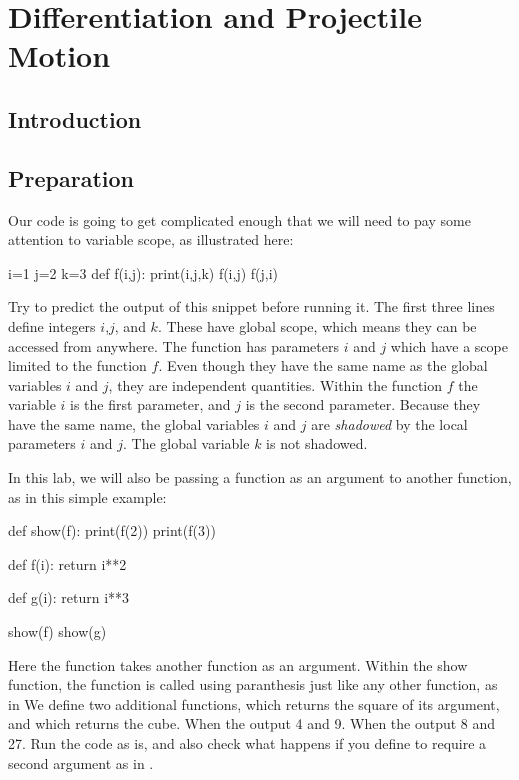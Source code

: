 \chapter{Differentiation and Projectile Motion}

\section{Introduction}

\section{Preparation}

Our code is going to get complicated enough that we will need to pay
some attention to variable scope, as illustrated here:
\begin{python}
i=1
j=2
k=3
def f(i,j):
    print(i,j,k)
f(i,j)
f(j,i)
\end{python}
Try to predict the output of this snippet before running it.  The
first three lines define integers $i$,$j$, and $k$. These have global
scope, which means they can be accessed from anywhere.  The function
 has parameters $i$ and $j$ which have a scope limited to
the function $f$.  Even though they have the same name as the global
variables $i$ and $j$, they are independent quantities.  Within the
function $f$ the variable $i$ is the first parameter, and $j$ is the
second parameter.  Because they have the same name, the global
variables $i$ and $j$ are {\em shadowed} by the local parameters $i$
and $j$.  The global variable $k$ is not shadowed.

In this lab, we will also be passing a function as an argument to another
function, as in this simple example:
\begin{python}
def show(f):
    print(f(2))
    print(f(3))    
    
def f(i):
    return i**2

def g(i):
    return i**3

show(f)
show(g)    
\end{python}
Here the  function takes another function  as an
argument.  Within the show function, the function  is called
using paranthesis just like any other function, as in  We
define two additional functions,  which returns the square of
its argument, and  which returns the cube.  When
 the output 4 and 9.  When  the output 8
and 27.  Run the code as is, and also check what happens if you define
 to require a second argument as in .

